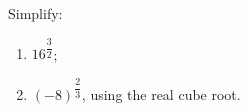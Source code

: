 Simplify:
\begin{enumerate}
\item[(a)] $16^{\dfrac32}$;
\item[(b)] $(-8)^{\dfrac23}$, using the real cube root.
\end{enumerate}
